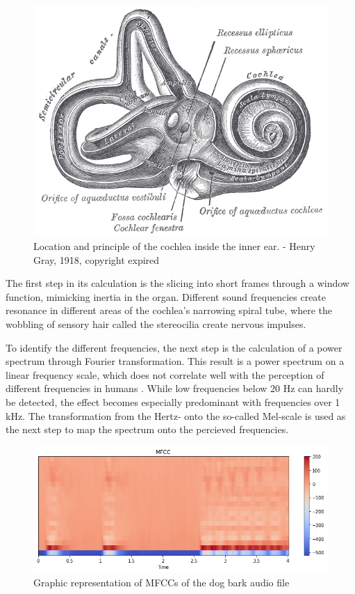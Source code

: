 \begin{figure}[h]
    \centering
	\includegraphics[width=.7\textwidth]{./images/illustrations/Gray921}
    \caption{Location and principle of the cochlea inside the inner ear. - Henry Gray, 1918, copyright expired}
    \label{fig:gray}
\end{figure}


The first step in its calculation is the slicing into short frames through a window function, mimicking inertia in the organ. Different sound frequencies create resonance in different areas of the cochlea’s narrowing spiral tube, where the wobbling of sensory hair called the stereocilia create nervous impulses.

To identify the different frequencies, the next step is the calculation of a power spectrum through Fourier transformation. This result is a power spectrum on a linear frequency scale, which does not correlate well with the perception of different frequencies in humans \cite{mel}. While low frequencies below 20 Hz can hardly be detected, the effect becomes especially predominant with frequencies over 1 kHz. The transformation from the Hertz- onto the so-called Mel-scale is used as the next step to map the spectrum onto the percieved frequencies. 
 
  \begin{figure}[h]
    \centering
	\includegraphics[width=.7\textwidth]{./images/illustrations/mfcc}
    \caption{Graphic representation of MFCCs of the dog bark audio file}
    \label{fig:mfcc}
\end{figure}
 
